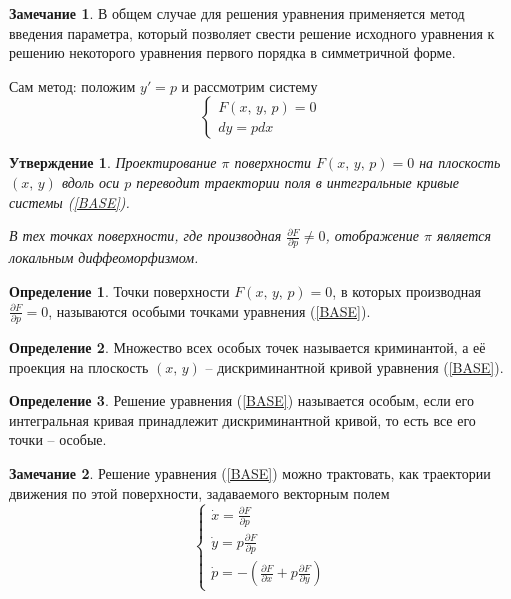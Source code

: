 \documentclass[a4paper,12pt]{article}
\theoremstyle{plain}
\newtheorem{proposition}{Утверждение}[section]
\theoremstyle{definition}
\newtheorem{definition}{Определение}[section]
\newtheorem*{note}{Замечание}
\theoremstyle{remark}
\begin{document}
\begin{note}
	В общем случае для решения уравнения применяется метод введения параметра, который позволяет свести решение исходного уравнения к решению некоторого уравнения первого порядка в симметричной форме.

	Сам метод: положим $y' = p$ и рассмотрим систему
	\begin{equation}
		\label{BASE}
		\begin{cases}
			F(x,\,y,\,p) = 0 \\
			dy = pdx
		\end{cases}
	\end{equation}
\end{note}

\begin{proposition}
	Проектирование $\pi$ поверхности $F(x,\,y,\,p) = 0$ на плоскость $(x,\,y)$ вдоль оси $p$ переводит траектории поля в интегральные кривые системы (\ref*{BASE}).

	В тех точках поверхности, где производная $\frac{\partial F}{\partial p} \neq 0$, отображение $\pi$ является локальным диффеоморфизмом.
\end{proposition}

\begin{definition}
	Точки поверхности $F(x,\,y,\,p) = 0$, в которых производная $\frac{\partial F}{\partial p} = 0$, называются особыми точками уравнения (\ref*{BASE}).
\end{definition}

\begin{definition}
	Множество всех особых точек называется криминантой, а её проекция на плоскость $(x,\,y)$ -- дискриминантной кривой уравнения (\ref*{BASE}).
\end{definition}

\begin{definition}
	Решение уравнения (\ref*{BASE}) называется особым, если его интегральная кривая принадлежит дискриминантной кривой, то есть все его точки -- особые.
\end{definition}

\begin{note}
	Решение уравнения (\ref*{BASE}) можно трактовать, как траектории движения по этой поверхности, задаваемого векторным полем
	\begin{equation}
		\label{PODN_POLE}
		\begin{cases}
			\dot{x} = \frac{\partial F}{\partial p}  \\
			\dot{y} = p\frac{\partial F}{\partial p} \\
			\dot{p} = -\left(\frac{\partial F}{\partial x} + p\frac{\partial F}{\partial y} \right)
		\end{cases}
	\end{equation}
\end{note}
\end{document}
